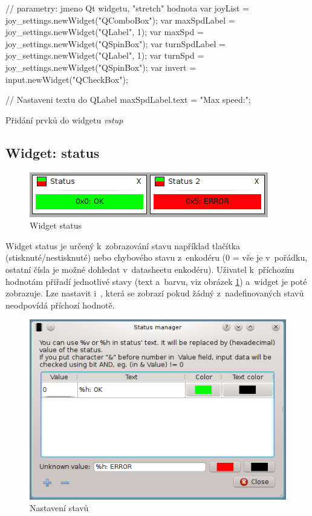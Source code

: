 \documentclass[12pt, a4paper, oneside]{article}
\newcommand{\It}{\textit}  %
\begin{document}
\begin{listing}[H]
\begin{jscode}
// parametry: jmeno Qt widgetu, "stretch" hodnota
var joyList = joy_settings.newWidget("QComboBox");
var maxSpdLabel = joy_settings.newWidget("QLabel", 1);
var maxSpd = joy_settings.newWidget("QSpinBox");
var turnSpdLabel = joy_settings.newWidget("QLabel", 1);
var turnSpd = joy_settings.newWidget("QSpinBox");
var invert = input.newWidget("QCheckBox");

// Nastaveni textu do QLabel
maxSpdLabel.text = "Max speed:";
\end{jscode}
\caption{Přidání prvků do widgetu \It{vstup}}
\label{input_script}
\end{listing}

\subsection{Widget: status}
\begin{figure}[H]
\begin{center}
\includegraphics[scale=1]{img/w_status.png}
\caption{Widget status}
\end{center}
\end{figure}
Widget status je určený k~zobrazování stavu například tlačítka (stisknuté/nestisknuté) nebo chybového stavu z~enkodéru (0 = vše je v~pořádku, ostatní čísla je možné dohledat v~datasheetu enkodéru). Uživatel k~příchozím hodnotám přiřadí jednotlivé stavy (text a~barvu, viz obrázek \ref{status_dlg}) a~widget je poté zobrazuje. Lze nastavit i~, která se zobrazí pokud žádný z~nadefinovaných stavů neodpovídá příchozí hodnotě.
\begin{figure}[H]
\begin{center}
\includegraphics[scale=1]{img/w_status_dlg.png}
\caption{Nastavení stavů}
\label{status_dlg}
\end{center}
\end{figure} 
\end{document}
